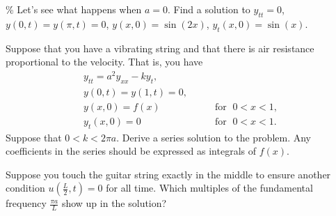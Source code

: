 \documentclass{ximera}
\begin{document}
\begin{exercise}\%
    Let's see what happens when $a=0$.  Find a solution to $y_{tt} = 0$, $y(0,t) = y(\pi,t) = 0$, $y(x,0) = \sin(2x)$, $y_t(x,0) = \sin(x)$.
\end{exercise}

\begin{exercise}[challenging]
    Suppose that you have a vibrating string and that there is air resistance proportional to the velocity.  That is, you have
    \begin{equation*}
    \begin{array}{ll}
        y_{tt} = a^2 y_{xx} - k y_t , &  \\
        y(0,t) = y(1,t) = 0 , &  \\
        y(x,0) = f(x) & \qquad \text{for } \; 0 < x < 1 , \\
        y_t(x,0) = 0 & \qquad \text{for } \; 0 < x < 1 .
    \end{array}
    \end{equation*}
    Suppose that $0 < k < 2 \pi a$. Derive a series solution to the problem.  Any coefficients in the series should be expressed as integrals of $f(x)$.
\end{exercise}

\begin{exercise}
    Suppose you touch the guitar string exactly in the middle to ensure another condition $u(\frac{L}{2},t) = 0$ for all time. Which multiples of the fundamental frequency $\frac{\pi a}{L}$ show up in the solution?
\end{exercise}

\end{document}
